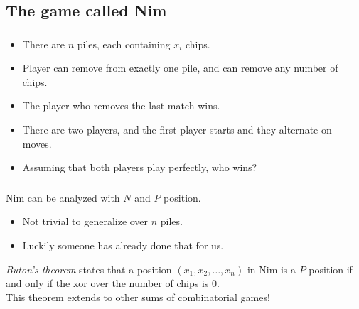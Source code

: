 \documentclass[10pt]{beamer}
\newcommand{\bi}{\begin{itemize}}
\newcommand{\ei}{\end{itemize}}
\begin{document}
\subsection{The game called Nim}
\begin{frame}
  \frametitle{\insertsubsection}
  \vspace{40pt}
  \bi
    \item There are $n$ piles, each containing $x_i$ chips.
    \item Player can remove from exactly one pile, and can remove any number of chips.
    \item The player who removes the last match wins.
    \item There are two players, and the first player starts and they alternate on moves.
    \item Assuming that both players play perfectly, who wins?
  \ei
\end{frame}

\begin{frame}
  \frametitle{\insertsubsection}
  \vspace{40pt}
  Nim can be analyzed with $N$ and $P$ position.
  \bi
    \item Not trivial to generalize over $n$ piles.
    \item Luckily someone has already done that for us.
  \ei
  \vspace{10pt}
  \emph{Buton's theorem} states that a position $(x_1, x_2, \ldots, x_n)$ in
  Nim is a $P$-position if and only if the xor over the number of chips is
  $0$. \\
  \vspace{10pt}
  This theorem extends to other sums of combinatorial games!
\end{frame}

\end{document}
